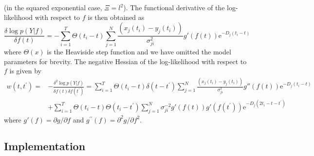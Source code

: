 \documentclass[english]{article}
\begin{document}
(in the squared exponential case, $\Xi=l^2$).
The functional
derivative of the log-likelihood with respect to $f$ is then obtained as
\begin{equation}
\frac{\delta \log p(Y|f)}{\delta f\left(t\right)} = -\sum_{i=1}^T \Theta(t_i -
 t)\sum_{j=1}^N 
\frac{(x_j(t_i) - y_{j}\left(t_i\right))}{\sigma^2_{ji} }g'(f(t))\mathrm{e}^{-D_j(t_i-t)}
\end{equation}
where $\Theta(x)$ is the Heaviside step function and we have omitted the model
parameters for brevity. 
The negative Hessian of the log-likelihood with 
respect to $f$ is given by
\begin{equation}\begin{split}
w(t,t^{\prime}) = &- \frac{\delta^2 \log p(Y|f)}{\delta f\left(t\right) 
\delta f\left(t^{\prime}
\right)} =\sum_{i=1}^T\Theta(t_i - t)\delta\left(t-t^{\prime}\right)
\sum_{j=1}^N 
\frac{\left(x_j(t_i) - y_{j}\left(t_i\right)\right)}{\sigma^2_{ji} } g''(f(t))\mathrm{e}^{-D_j(t_i-t)} \\
& +\sum_{i=1}^T \Theta(t_i-t)\Theta\left(t_i-t^{\prime}\right)
\sum_{j=1}^N \sigma_{ji}^{-2}
g'\left(f(t)\right) g'\left(f(t^{\prime})\right) 
\mathrm{e}^{-D_j(2t_i-t-t^{\prime})}
\end{split}\end{equation}
where $g'(f)=\partial g/\partial f$ and $g^{\prime\prime}(f)=\partial^2 g/\partial f^2$.
\subsection{Implementation}
\end{document}
